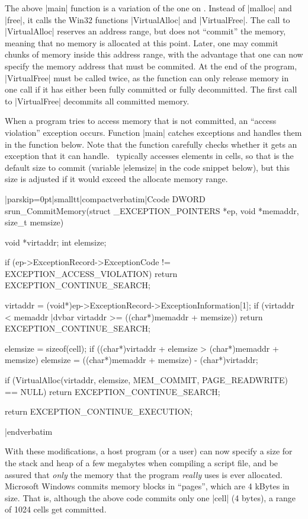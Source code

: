 The above |main| function is a variation of the one on . Instead
of |malloc| and |free|, it calls the Win32 functions |VirtualAlloc| and
|VirtualFree|. The call to |VirtualAlloc| reserves an address range, but does
not ``commit'' the memory, meaning that no memory is allocated at this point.
Later, one may commit chunks of memory inside this address range, with the
advantage that one can now specify the memory address that must be commited.
At the end of the program, |VirtualFree| must be called twice, as the function
can only release memory in one call if it has either been fully committed or
fully decommitted. The first call to |VirtualFree| decommits all committed
memory.

When a program tries to access memory that is not committed, an ``access violation''
exception occurs. Function |main| catches exceptions and handles them in the
function below. Note that the function carefully checks whether it gets an
exception that it can handle. \Small\ typically accesses elements in cells, so
that is the default size to commit (variable |elemsize| in the code snippet
below), but this size is adjusted if it would exceed the allocate memory range.

\listingx\verbatim|parskip=0pt|smalltt|compactverbatim|Ccode
DWORD srun_CommitMemory(struct _EXCEPTION_POINTERS *ep, void *memaddr,
                        size_t memsize)
{
  void *virtaddr;
  int elemsize;

  if (ep->ExceptionRecord->ExceptionCode != EXCEPTION_ACCESS_VIOLATION)
    return EXCEPTION_CONTINUE_SEARCH;

  virtaddr = (void*)ep->ExceptionRecord->ExceptionInformation[1];
  if (virtaddr < memaddr |dvbar virtaddr >= ((char*)memaddr + memsize))
    return EXCEPTION_CONTINUE_SEARCH;

  elemsize = sizeof(cell);
  if ((char*)virtaddr + elemsize > (char*)memaddr + memsize)
    elemsize = ((char*)memaddr + memsize) - (char*)virtaddr;

  if (VirtualAlloc(virtaddr, elemsize, MEM_COMMIT, PAGE_READWRITE) == NULL)
    return EXCEPTION_CONTINUE_SEARCH;

  return EXCEPTION_CONTINUE_EXECUTION;
}
|endverbatim\endlistingx

With these modifications, a host program (or a user) can now specify a size
for the stack and heap of a few megabytes when compiling a script file, and be
assured that {\it only\/} the memory that the program {\it really\/} uses is
ever allocated. Microsoft Windows commits memory blocks in ``pages'', which are
4 kBytes in size. That is, although the above code commits only one |cell| (4 bytes),
a range of 1024 cells get committed.

